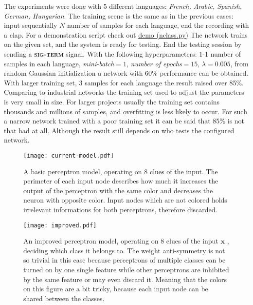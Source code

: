 The experiments were done with 5 different languages: \emph{French, Arabic, Spanish, German, Hungarian}. The training scene is the same as in the previous cases: input sequentially $N$ number of samples for each language, end the recording with a clap.
For a demonstration script check out \href{https://github.com/botcs/deepvision/tree/master/demo/audio}{demo (nclass.py)}
The network trains on the given set, and the system is ready for testing. End the testing session by sending a \textbf{\textsc{sig-term}} signal. With the following hyperparameters: 1-1 number of samples in each language, \emph{mini-batch}$=1$, \emph{number of epochs}$=15$, $\lambda=0.005$, from random Gaussian initialization a network with 60\% performance can be obtained. With larger training set, 3 samples for each language the result raised over 85\%. Comparing to industrial networks the training set used to adjust the parameters is very small in size. For larger projects usually the training set contains thousands and millions of samples, and overfitting is less likely to occur. For such a narrow network trained with a poor training set it can be said that 85\% is not that bad at all. Although the result still depends on who tests the configured network.

\begin{figure}
	\centering
	\texttt{[image: current-model.pdf]}
	\caption{A basic perceptron model, operating on 8 clues of the input. The perimeter of each input node describes how much it increases the output of the perceptron with the same color and decreases the neuron with opposite color. Input nodes which are not colored holds irrelevant informations for both perceptrons, therefore discarded.}
	
	\label{fig:dumb}
\end{figure}

\begin{figure}
	\centering
	\texttt{[image: improved.pdf]}
	\caption{An improved perceptron model, operating on 8 clues of the input $\mathbf{x}$ , deciding which class it belongs to. The weight anti-symmetry is not so trivial in this case because perceptrons of multiple classes can be turned on by one single feature while other perceptrons are inhibited by the same feature or may even discard it. Meaning that the colors on this figure are a bit tricky, because each input node can be shared between the classes.}
	
	\label{fig:improved}
\end{figure}

